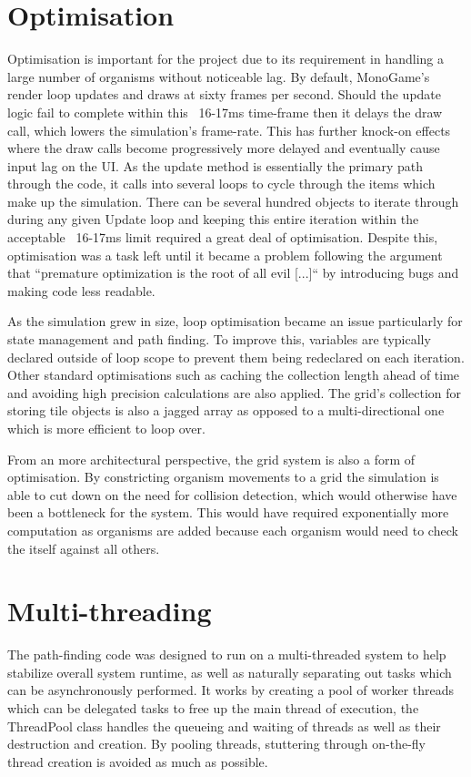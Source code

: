 \documentclass[a4paper, oneside, 11pt]{report}
\begin{document}
\section{Optimisation}\label{optim}
Optimisation is important for the project due to its requirement in handling a large number of organisms without noticeable lag. By default, MonoGame's render loop updates and draws at sixty frames per second. Should the update logic fail to complete within this ~16-17ms time-frame then it delays the draw call, which lowers the simulation's frame-rate. This has further knock-on effects where the draw calls become progressively more delayed and eventually cause input lag on the UI. As the update method is essentially the primary path through the code, it calls into several loops to cycle through the items which make up the simulation. There can be several hundred objects to iterate through during any given Update loop and keeping this entire iteration within the acceptable ~16-17ms limit required a great deal of optimisation. Despite this, optimisation was a task left until it became a problem following the argument that ``premature optimization is the root of all evil [...]`` \cite{knuth} by introducing bugs and making code less readable. 

As the simulation grew in size, loop optimisation became an issue particularly for state management and path finding. To improve this, variables are typically declared outside of loop scope to prevent them being redeclared on each iteration. Other standard optimisations such as caching the collection length ahead of time and avoiding high precision calculations are also applied. The grid's collection for storing tile objects is also a jagged array as opposed to a multi-directional one which is more efficient to loop over.

From an more architectural perspective, the grid system is also a form of optimisation. By constricting organism movements to a grid the simulation is able to cut down on the need for collision detection, which would otherwise have been a bottleneck for the system. This would have required exponentially more computation as organisms are added because each organism would need to check the itself against all others.

\section{Multi-threading} \label{multithreading}
The path-finding code was designed to run on a multi-threaded system to help stabilize overall system runtime, as well as naturally separating out tasks which can be asynchronously performed. It works by creating a pool of worker threads which can be delegated tasks to free up the main thread of execution, the ThreadPool class handles the queueing and waiting of threads as well as their destruction and creation. By pooling threads, stuttering through on-the-fly thread creation is avoided as much as possible.
\end{document}
